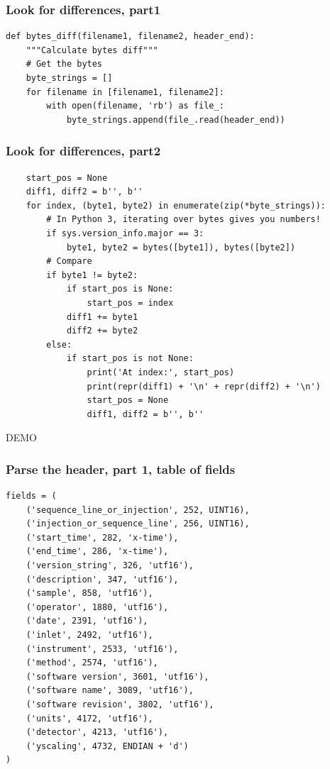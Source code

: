 \documentclass{beamer}
\begin{document}
\begin{frame}[fragile]
  \frametitle{Look for differences, part1}
  \small
  \begin{verbatim}
def bytes_diff(filename1, filename2, header_end):
    """Calculate bytes diff"""
    # Get the bytes
    byte_strings = []
    for filename in [filename1, filename2]:
        with open(filename, 'rb') as file_:
            byte_strings.append(file_.read(header_end))
  \end{verbatim}
\end{frame}

\begin{frame}[fragile]
  \frametitle{Look for differences, part2}
  \small
  \begin{verbatim}
    start_pos = None
    diff1, diff2 = b'', b''
    for index, (byte1, byte2) in enumerate(zip(*byte_strings)):
        # In Python 3, iterating over bytes gives you numbers!
        if sys.version_info.major == 3:
            byte1, byte2 = bytes([byte1]), bytes([byte2])
        # Compare
        if byte1 != byte2:
            if start_pos is None:
                start_pos = index
            diff1 += byte1
            diff2 += byte2
        else:
            if start_pos is not None:
                print('At index:', start_pos)
                print(repr(diff1) + '\n' + repr(diff2) + '\n')
                start_pos = None
                diff1, diff2 = b'', b''
  \end{verbatim}
  \LARGE DEMO
\end{frame}

\begin{frame}[fragile]
  \frametitle{Parse the header, part 1, table of fields}
  \small
  \begin{verbatim}
fields = (
    ('sequence_line_or_injection', 252, UINT16),
    ('injection_or_sequence_line', 256, UINT16),
    ('start_time', 282, 'x-time'),
    ('end_time', 286, 'x-time'),
    ('version_string', 326, 'utf16'),
    ('description', 347, 'utf16'),
    ('sample', 858, 'utf16'),
    ('operator', 1880, 'utf16'),
    ('date', 2391, 'utf16'),
    ('inlet', 2492, 'utf16'),
    ('instrument', 2533, 'utf16'),
    ('method', 2574, 'utf16'),
    ('software version', 3601, 'utf16'),
    ('software name', 3089, 'utf16'),
    ('software revision', 3802, 'utf16'),
    ('units', 4172, 'utf16'),
    ('detector', 4213, 'utf16'),
    ('yscaling', 4732, ENDIAN + 'd')
)
  \end{verbatim}
\end{frame}
\end{document}
